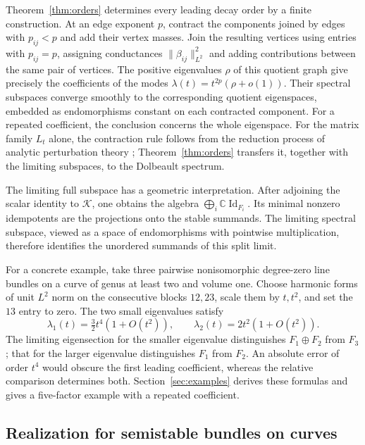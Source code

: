 \documentclass[11pt]{amsart}
\theoremstyle{definition}
\theoremstyle{remark}
\newcommand{\CC}{\mathbb C}
\newcommand{\id}{\operatorname{Id}}
\begin{document}
Theorem~\ref{thm:orders} determines every leading decay order by a
finite construction. At an edge exponent $p$, contract the
components joined by edges with $p_{ij}<p$ and add their vertex
masses. Join the resulting vertices using entries with $p_{ij}=p$,
assigning conductances $\lVert\beta_{ij}\rVert_{L^2}^2$ and adding
contributions between the same pair of vertices. The positive
eigenvalues $\rho$ of this quotient graph give
precisely the coefficients of the modes
$\lambda(t)=t^{2p}(\rho+o(1))$. Their spectral subspaces converge
smoothly to the corresponding quotient eigenspaces, embedded as
endomorphisms constant on each contracted component. For a repeated
coefficient, the conclusion concerns the whole eigenspace. For the
matrix family $L_t$ alone, the contraction rule follows from the
reduction process of analytic perturbation theory
\cite[Chapter~II, \S2.3]{Kato1995}; Theorem~\ref{thm:orders} transfers
it, together with the limiting subspaces, to the Dolbeault spectrum.

The limiting full subspace has a geometric interpretation. After
adjoining the scalar identity to $\mathcal K$, one obtains the algebra
$\bigoplus_i\CC\id_{F_i}$. Its minimal nonzero idempotents are the
projections onto the stable summands. The limiting spectral subspace,
viewed as a space of endomorphisms with pointwise multiplication,
therefore identifies the unordered summands of this split
limit.

For a concrete example, take three pairwise nonisomorphic degree-zero
line bundles on a curve of genus at least two and volume one. Choose
harmonic forms of unit $L^2$ norm on the consecutive blocks $12,23$,
scale them by $t,t^2$, and set the $13$ entry to zero. The two small
eigenvalues satisfy
\[
 \lambda_1(t)=\tfrac32t^4(1+O(t^2)),\qquad
 \lambda_2(t)=2t^2(1+O(t^2)).
\]
The limiting eigensection for the smaller eigenvalue distinguishes
$F_1\oplus F_2$ from $F_3$; that for the larger eigenvalue distinguishes
$F_1$ from $F_2$. An absolute error of order $t^4$
would obscure the first leading coefficient, whereas the relative
comparison determines both. Section~\ref{sec:examples} derives these
formulas and gives a five-factor example with a repeated coefficient.

\subsection{Realization for semistable bundles on curves}
\end{document}
